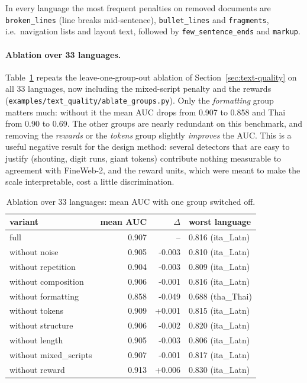 In every language the most frequent penalties on removed documents are
\texttt{broken\_lines} (line breaks mid-sentence), \texttt{bullet\_lines} and
\texttt{fragments}, i.e.\ navigation lists and layout text, followed by
\texttt{few\_sentence\_ends} and \texttt{markup}.

\paragraph{Ablation over 33 languages.} Table~\ref{tab:ablation33} repeats the
leave-one-group-out ablation of Section~\ref{sec:text-quality} on all 33 languages, now
including the mixed-script penalty and the rewards
(\texttt{examples/text\_quality/ablate\_groups.py}). Only the \emph{formatting} group
matters much: without it the mean AUC drops from 0.907 to 0.858 and Thai from 0.90 to
0.69. The other groups are nearly redundant on this benchmark, and removing the
\emph{rewards} or the \emph{tokens} group slightly \emph{improves} the AUC. This is a
useful negative result for the design method: several detectors that are easy to
justify (shouting, digit runs, giant tokens) contribute nothing measurable to agreement
with FineWeb-2, and the reward units, which were meant to make the scale interpretable,
cost a little discrimination.

\begin{table}[t]\centering\small
\caption{Ablation over 33 languages: mean AUC with one group switched off.}
\label{tab:ablation33}
\begin{tabular}{lrrl}
\toprule
variant & mean AUC & $\Delta$ & worst language \\
\midrule
full & 0.907 & -- & 0.816 (ita\_Latn) \\
without noise & 0.905 & -0.003 & 0.810 (ita\_Latn) \\
without repetition & 0.904 & -0.003 & 0.809 (ita\_Latn) \\
without composition & 0.906 & -0.001 & 0.816 (ita\_Latn) \\
without formatting & 0.858 & -0.049 & 0.688 (tha\_Thai) \\
without tokens & 0.909 & +0.001 & 0.815 (ita\_Latn) \\
without structure & 0.906 & -0.002 & 0.820 (ita\_Latn) \\
without length & 0.905 & -0.003 & 0.806 (ita\_Latn) \\
without mixed\_scripts & 0.907 & -0.001 & 0.817 (ita\_Latn) \\
without reward & 0.913 & +0.006 & 0.830 (ita\_Latn) \\
\bottomrule
\end{tabular}
\end{table}
